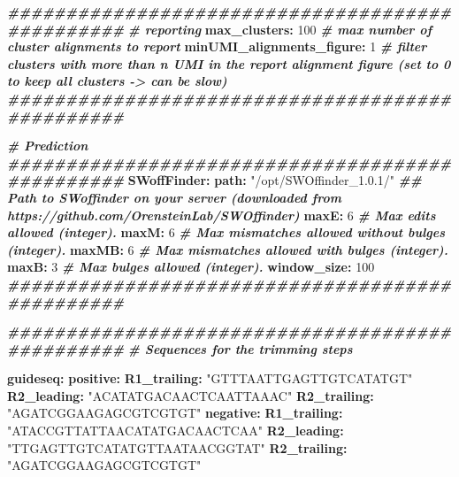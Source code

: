\documentclass[
]{article}
\newenvironment{Shaded}{\begin{snugshade}}{\end{snugshade}}
\newcommand{\AttributeTok}[1]{\textcolor[rgb]{0.74,0.68,0.62}{#1}}
\newcommand{\CommentTok}[1]{\textcolor[rgb]{0.00,0.40,1.00}{\textbf{\textit{#1}}}}
\newcommand{\DecValTok}[1]{\textcolor[rgb]{0.27,0.67,0.26}{#1}}
\newcommand{\FunctionTok}[1]{\textcolor[rgb]{1.00,0.58,0.35}{\textbf{#1}}}
\newcommand{\KeywordTok}[1]{\textcolor[rgb]{0.26,0.66,0.93}{\textbf{#1}}}
\newcommand{\StringTok}[1]{\textcolor[rgb]{0.02,0.61,0.04}{#1}}
\begin{document}
\begin{Shaded}
\begin{Highlighting}[]
\CommentTok{\#\#\#\#\#\#\#\#\#\#\#\#\#\#\#\#\#\#\#\#\#\#\#\#\#\#\#\#\#\#\#\#\#\#\#\#\#\#\#\#\#\#\#\#\#\#\#\#}
\CommentTok{\# reporting}
\FunctionTok{max\_clusters}\KeywordTok{:}\AttributeTok{ }\DecValTok{100}\CommentTok{                 \# max number of cluster alignments to report}
\FunctionTok{minUMI\_alignments\_figure}\KeywordTok{:}\AttributeTok{ }\DecValTok{1}\CommentTok{       \# filter clusters with more than n UMI in the report alignment figure (set to 0 to keep all clusters {-}\textgreater{} can be slow)}
\CommentTok{\#\#\#\#\#\#\#\#\#\#\#\#\#\#\#\#\#\#\#\#\#\#\#\#\#\#\#\#\#\#\#\#\#\#\#\#\#\#\#\#\#\#\#\#\#\#\#\#}

\CommentTok{\# Prediction}
\CommentTok{\#\#\#\#\#\#\#\#\#\#\#\#\#\#\#\#\#\#\#\#\#\#\#\#\#\#\#\#\#\#\#\#\#\#\#\#\#\#\#\#\#\#\#\#\#\#\#\#}
\FunctionTok{SWoffFinder}\KeywordTok{:}
\AttributeTok{  }\FunctionTok{path}\KeywordTok{:}\AttributeTok{ }\StringTok{"/opt/SWOffinder\_1.0.1/"}\CommentTok{ \#\# Path to SWoffinder on your server (downloaded from https://github.com/OrensteinLab/SWOffinder)}
\AttributeTok{  }\FunctionTok{maxE}\KeywordTok{:}\AttributeTok{ }\DecValTok{6}\CommentTok{                 \# Max edits allowed (integer).}
\AttributeTok{  }\FunctionTok{maxM}\KeywordTok{:}\AttributeTok{ }\DecValTok{6}\CommentTok{                 \# Max mismatches allowed without bulges (integer).}
\AttributeTok{  }\FunctionTok{maxMB}\KeywordTok{:}\AttributeTok{ }\DecValTok{6}\CommentTok{                \# Max mismatches allowed with bulges (integer).}
\AttributeTok{  }\FunctionTok{maxB}\KeywordTok{:}\AttributeTok{ }\DecValTok{3}\CommentTok{                 \# Max bulges allowed (integer).}
\AttributeTok{  }\FunctionTok{window\_size}\KeywordTok{:}\AttributeTok{ }\DecValTok{100}
\CommentTok{\#\#\#\#\#\#\#\#\#\#\#\#\#\#\#\#\#\#\#\#\#\#\#\#\#\#\#\#\#\#\#\#\#\#\#\#\#\#\#\#\#\#\#\#\#\#\#\#}



\CommentTok{\#\#\#\#\#\#\#\#\#\#\#\#\#\#\#\#\#\#\#\#\#\#\#\#\#\#\#\#\#\#\#\#\#\#\#\#\#\#\#\#\#\#\#\#\#\#\#\#}
\CommentTok{\# Sequences for the trimming steps}

\FunctionTok{guideseq}\KeywordTok{:}
\AttributeTok{  }\FunctionTok{positive}\KeywordTok{:}
\AttributeTok{    }\FunctionTok{R1\_trailing}\KeywordTok{:}\AttributeTok{ }\StringTok{"GTTTAATTGAGTTGTCATATGT"}
\AttributeTok{    }\FunctionTok{R2\_leading}\KeywordTok{:}\AttributeTok{ }\StringTok{"ACATATGACAACTCAATTAAAC"}
\AttributeTok{    }\FunctionTok{R2\_trailing}\KeywordTok{:}\AttributeTok{ }\StringTok{"AGATCGGAAGAGCGTCGTGT"}
\AttributeTok{  }\FunctionTok{negative}\KeywordTok{:}
\AttributeTok{    }\FunctionTok{R1\_trailing}\KeywordTok{:}\AttributeTok{ }\StringTok{"ATACCGTTATTAACATATGACAACTCAA"}
\AttributeTok{    }\FunctionTok{R2\_leading}\KeywordTok{:}\AttributeTok{ }\StringTok{"TTGAGTTGTCATATGTTAATAACGGTAT"}
\AttributeTok{    }\FunctionTok{R2\_trailing}\KeywordTok{:}\AttributeTok{ }\StringTok{"AGATCGGAAGAGCGTCGTGT"}




\end{Highlighting}
\end{Shaded}
\end{document}
